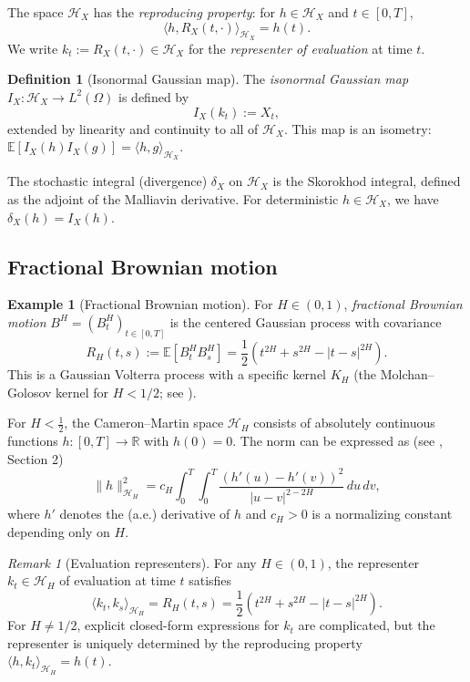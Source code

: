 \documentclass[11pt,a4paper]{article}
\theoremstyle{plain}
\theoremstyle{definition}
\newtheorem{definition}[theorem]{Definition}
\newtheorem{example}[theorem]{Example}
\theoremstyle{remark}
\newtheorem{remark}[theorem]{Remark}
\newcommand{\R}{\mathbb{R}}
\newcommand{\E}{\mathbb{E}}
\newcommand{\ip}[2]{\langle #1, #2 \rangle}
\newcommand{\norm}[1]{\| #1 \|}
\newcommand{\Lp}[1]{L^{#1}}
\newcommand{\HH}{\mathcal{H}_H}
\newcommand{\HX}{\mathcal{H}_X}
\begin{document}
The space $\HX$ has the \emph{reproducing property}: for $h \in \HX$ and $t \in [0,T]$,
\[
\ip{h}{R_X(t, \cdot)}_{\HX} = h(t).
\]
We write $k_t := R_X(t, \cdot) \in \HX$ for the \emph{representer of evaluation} at time $t$.

\begin{definition}[Isonormal Gaussian map]\label{def:isonormal}
The \emph{isonormal Gaussian map} $I_X : \HX \to \Lp{2}(\Omega)$ is defined by
\[
I_X(k_t) := X_t,
\]
extended by linearity and continuity to all of $\HX$. This map is an isometry: $\E[I_X(h)I_X(g)] = \ip{h}{g}_{\HX}$.
\end{definition}

The stochastic integral (divergence) $\delta_X$ on $\HX$ is the Skorokhod integral, defined as the adjoint of the Malliavin derivative. For deterministic $h \in \HX$, we have $\delta_X(h) = I_X(h)$.

\subsection{Fractional Brownian motion}

\begin{example}[Fractional Brownian motion]\label{ex:fBM}
For $H \in (0, 1)$, \emph{fractional Brownian motion} $B^H = (B^H_t)_{t\in[0,T]}$ is the centered Gaussian process with covariance
\begin{equation}\label{eq:fBM-cov}
R_H(t, s) := \E[B^H_t B^H_s] = \frac{1}{2}\left(t^{2H} + s^{2H} - |t - s|^{2H}\right).
\end{equation}
This is a Gaussian Volterra process with a specific kernel $K_H$ (the Molchan--Golosov kernel for $H < 1/2$; see \cite{DU99}).

For $H < \frac{1}{2}$, the Cameron--Martin space $\HH$ consists of absolutely continuous functions $h: [0,T] \to \R$ with $h(0) = 0$. The norm can be expressed as (see \cite{DU99}, Section 2)
\begin{equation}\label{eq:HH-norm}
\norm{h}^2_{\HH} = c_H \int_0^T \int_0^T \frac{(h'(u) - h'(v))^2}{|u-v|^{2-2H}} \, du \, dv,
\end{equation}
where $h'$ denotes the (a.e.) derivative of $h$ and $c_H > 0$ is a normalizing constant depending only on $H$.
\end{example}

\begin{remark}[Evaluation representers]\label{rem:representers}
For any $H \in (0,1)$, the representer $k_t \in \HH$ of evaluation at time $t$ satisfies
\[
\ip{k_t}{k_s}_{\HH} = R_H(t, s) = \frac{1}{2}(t^{2H} + s^{2H} - |t - s|^{2H}).
\]
For $H \neq 1/2$, explicit closed-form expressions for $k_t$ are complicated, but the representer is uniquely determined by the reproducing property $\ip{h}{k_t}_{\HH} = h(t)$.
\end{remark}
\end{document}
